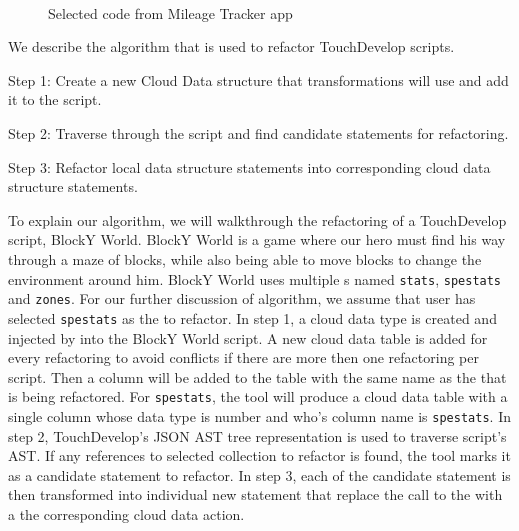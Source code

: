 \documentclass{sigplanconf}
\begin{document}
\begin{figure}
   \centering
    \mbox{
      \subfigure[before]{
      
      \label{fig:aicOverload}
      }
      \hspace{0.2in}
      \subfigure[after]{
      
      \label{fig:lambdaOverload}
      }
    }
    \caption{Selected code from Mileage Tracker app}
    \label{fig:anonCornerCase2}
\end{figure}


We describe the algorithm that is used to refactor TouchDevelop scripts.   

Step 1: Create a new Cloud Data structure that transformations will use and add it to the script.

Step 2: Traverse through the script and find candidate statements for refactoring.

Step 3: Refactor local data structure statements into corresponding cloud data structure statements.

To explain our algorithm, we will walkthrough the refactoring of a TouchDevelop script, BlockY World.  BlockY World is a game where our hero must find his way through a maze of blocks, while also being able to move blocks to change the environment around him.  BlockY World uses multiple \NC{}s named \texttt{stats}, \texttt{spestats} and \texttt{zones}. For our further discussion of algorithm, we assume that user has selected \texttt{spestats} as the \NC{} to refactor. In step 1, a cloud data type is created and injected by \tool into the BlockY World script.  A new cloud data table is added for every refactoring to avoid conflicts if there are more then one refactoring per script. Then a column will be added to the table with the same name as the \NC{} that is being refactored.  For \texttt{spestats}, the tool will produce a cloud data table with a single column whose data type is number and who's column name is \texttt{spestats}.  In step 2, TouchDevelop's JSON AST tree representation is used to traverse script's AST. If any references to selected collection to refactor is found, the tool marks it as a candidate statement to refactor.  In step 3, each of the candidate statement is then transformed into individual new statement that replace the call to the \NC{} with a the corresponding cloud data action. 
\end{document}
